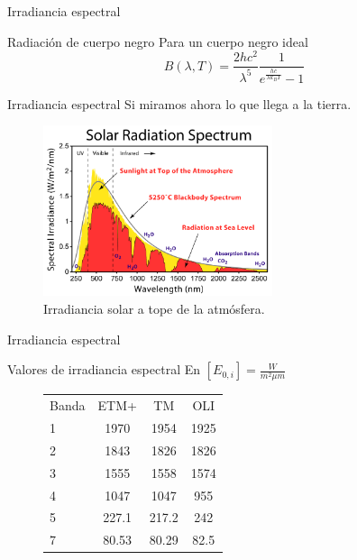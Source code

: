 \documentclass[handout]{beamer}
\begin{document}
\begin{frame}{Irradiancia espectral}
  \begin{block}{Radiación de cuerpo negro}
    Para un cuerpo negro ideal
    \begin{equation}
      B(\lambda,T) = \frac{2hc^2}{\lambda^5}\frac{1}{e^{\frac{hc}{\lambda k_B T}}-1}
    \end{equation}
  \end{block}
\end{frame}

\begin{frame}{Irradiancia espectral}
  Si miramos ahora lo que llega a la tierra.
  \begin{figure}
    \includegraphics[width=0.6\textwidth]{imagenes/solar_spectrum.png}
    \caption{Irradiancia solar a tope de la atmósfera.}
  \end{figure}
\end{frame}

\begin{frame}{Irradiancia espectral}
  \begin{exampleblock}{Valores de irradiancia espectral}
    En $[E_{0,i}] = \frac{W}{m^2 \mu m}$
    \begin{figure}
      \begin{tabular}{l c c c}
          Banda & ETM+  & TM    &  OLI \\
          1     & 1970  & 1954  & 1925 \\
          2     & 1843  & 1826  & 1826 \\
          3     & 1555  & 1558  & 1574 \\
          4     & 1047  & 1047  & 955  \\
          5     & 227.1 & 217.2 & 242 \\
          7     & 80.53 & 80.29 & 82.5\\
      \end{tabular}
    \end{figure}
  \end{exampleblock}
\end{frame}
\end{document}
